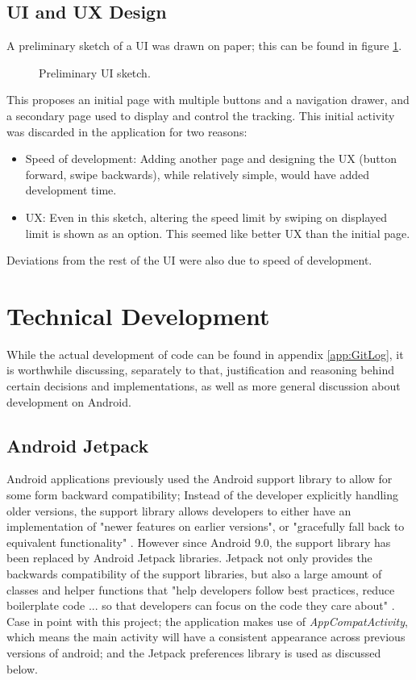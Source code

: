 \documentclass[11pt, a4paper, notitlepage]{report}
\begin{document}
\section{UI and UX Design}
A preliminary sketch of a UI was drawn on paper; this can be found in figure \ref{fig:UIPage}.
\begin{figure}
	\centering
	\caption{Preliminary UI sketch.}
	\label{fig:UIPage}
\end{figure}

This proposes an initial page with multiple buttons and a navigation drawer, and a secondary page used to display and control the tracking. This initial activity was discarded in the application for two reasons:
\begin{itemize}
	\item Speed of development: Adding another page and designing the UX (button forward, swipe backwards), while relatively simple, would have added development time.
	\item UX: Even in this sketch, altering the speed limit by swiping on displayed limit is shown as an option. This seemed like better UX than the initial page.
\end{itemize}

Deviations from the rest of the UI were also due to speed of development.

\chapter{Technical Development}\label{ch:TechDev}
While the actual development of code can be found in appendix \ref{app:GitLog}, it is worthwhile discussing, separately to that, justification and reasoning behind certain decisions and implementations, as well as more general discussion about development on Android.

\section{Android Jetpack}
Android applications previously used the Android support library to allow for some form backward compatibility; Instead of the developer explicitly handling older versions, the support library allows developers to either have an implementation of "newer features on earlier versions", or "gracefully fall back to equivalent functionality" \citep{supportLibAndroid}. However since Android 9.0, the support library has been replaced by Android Jetpack libraries. Jetpack not only provides the backwards compatibility of the support libraries, but also a large amount of classes and helper functions that "help developers follow best practices, reduce boilerplate code ... so that developers can focus on the code they care about" \citep{AndroidJetpack}. Case in point with this project; the application makes use of \textit{AppCompatActivity}, which means the main activity will have a consistent appearance across previous versions of android; and the Jetpack preferences library is used as discussed below.
\end{document}
